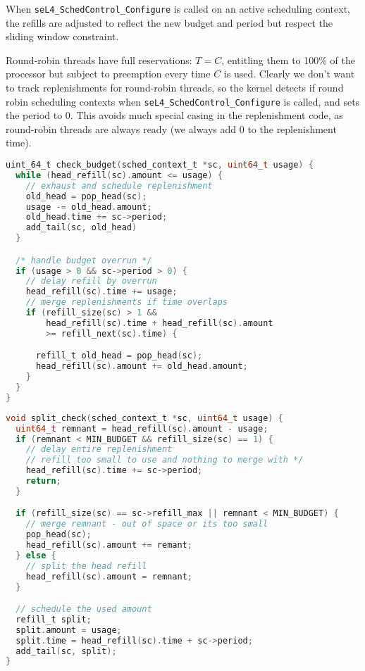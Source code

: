 When \texttt{seL4\_SchedControl\_Configure} is called on an active scheduling context, the refills are adjusted to reflect the new budget and period but respect the sliding window constraint.

Round-robin threads have full reservations: $T = C$, entitling them to 100\% of the processor but subject to preemption every time $C$ is used.
Clearly we don't want to track replenishments for round-robin threads, so the kernel detects if round robin scheduling contexts when \texttt{seL4\_SchedControl\_Configure} is called, and sets the period to 0.
This avoids much special casing in the replenishment code, as round-robin threads are always ready (we always add 0 to the replenishment time).

\begin{lstlisting}[frame=single,language=c,caption=Check budget routine.,label=list:check-budget,float=htpb]
uint_64_t check_budget(sched_context_t *sc, uint64_t usage) {
  while (head_refill(sc).amount <= usage) {
    // exhaust and schedule replenishment
    old_head = pop_head(sc);
    usage -= old_head.amount;
    old_head.time += sc->period;
    add_tail(sc, old_head)
  }

  /* handle budget overrun */
  if (usage > 0 && sc->period > 0) {
    // delay refill by overrun
    head_refill(sc).time += usage;
    // merge replenishments if time overlaps
    if (refill_size(sc) > 1 &&
        head_refill(sc).time + head_refill(sc).amount
        >= refill_next(sc).time) {

      refill_t old_head = pop_head(sc);
      head_refill(sc).amount += old_head.amount;
    }
  }
}
\end{lstlisting}

\begin{lstlisting}[frame=single,language=c,caption=Split check routine.,label=list:split-check,float=htpb]
void split_check(sched_context_t *sc, uint64_t usage) {
  uint64_t remnant = head_refill(sc).amount - usage;
  if (remnant < MIN_BUDGET && refill_size(sc) == 1) {
    // delay entire replenishment
    // refill too small to use and nothing to merge with */
    head_refill(sc).time += sc->period;
    return;
  }

  if (refill_size(sc) == sc->refill_max || remnant < MIN_BUDGET) {
    // merge remnant - out of space or its too small
    pop_head(sc);
    head_refill(sc).amount += remant;
  } else {
    // split the head refill
    head_refill(sc).amount = remnant;
  }

  // schedule the used amount
  refill_t split;
  split.amount = usage;
  split.time = head_refill(sc).time + sc->period;
  add_tail(sc, split);
}
\end{lstlisting}

